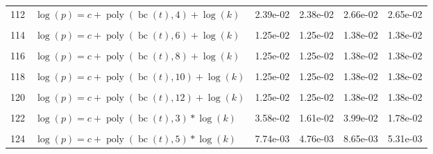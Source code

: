 \documentclass[12pt,a4paper]{article}
\DeclareMathOperator{\bc}{bc}
\DeclareMathOperator{\poly}{poly}
\begin{document}
\begin{longtable}[t]{ll>{\raggedleft\arraybackslash}p{2cm}>{\raggedleft\arraybackslash}p{2cm}>{\raggedleft\arraybackslash}p{2cm}>{\raggedleft\arraybackslash}p{2cm}}
112 & $\log(p) = c + \poly\left( \bc(t), 4 \right) + \log(k)$ & 2.39e-02 & 2.38e-02 & 2.66e-02 & 2.65e-02\\
\cellcolor{gray!6}{113} & \cellcolor{gray!6}{$\log(p) = c + \poly\left( \bc(t), 5 \right) + \log(k)$} & \cellcolor{gray!6}{1.56e-02} & \cellcolor{gray!6}{1.37e-02} & \cellcolor{gray!6}{1.73e-02} & \cellcolor{gray!6}{1.51e-02}\\
114 & $\log(p) = c + \poly\left( \bc(t), 6 \right) + \log(k)$ & 1.25e-02 & 1.25e-02 & 1.38e-02 & 1.38e-02\\
\cellcolor{gray!6}{115} & \cellcolor{gray!6}{$\log(p) = c + \poly\left( \bc(t), 7 \right) + \log(k)$} & \cellcolor{gray!6}{1.29e-02} & \cellcolor{gray!6}{1.28e-02} & \cellcolor{gray!6}{1.42e-02} & \cellcolor{gray!6}{1.41e-02}\\
116 & $\log(p) = c + \poly\left( \bc(t), 8 \right) + \log(k)$ & 1.25e-02 & 1.25e-02 & 1.38e-02 & 1.38e-02\\
\cellcolor{gray!6}{117} & \cellcolor{gray!6}{$\log(p) = c + \poly\left( \bc(t), 9 \right) + \log(k)$} & \cellcolor{gray!6}{1.25e-02} & \cellcolor{gray!6}{1.25e-02} & \cellcolor{gray!6}{1.38e-02} & \cellcolor{gray!6}{1.38e-02}\\
118 & $\log(p) = c + \poly\left( \bc(t), 10 \right) + \log(k)$ & 1.25e-02 & 1.25e-02 & 1.38e-02 & 1.38e-02\\
\cellcolor{gray!6}{119} & \cellcolor{gray!6}{$\log(p) = c + \poly\left( \bc(t), 11 \right) + \log(k)$} & \cellcolor{gray!6}{1.25e-02} & \cellcolor{gray!6}{1.25e-02} & \cellcolor{gray!6}{1.38e-02} & \cellcolor{gray!6}{1.38e-02}\\
120 & $\log(p) = c + \poly\left( \bc(t), 12 \right) + \log(k)$ & 1.25e-02 & 1.25e-02 & 1.38e-02 & 1.38e-02\\
\cellcolor{gray!6}{121} & \cellcolor{gray!6}{$\log(p) = c + \poly\left( \bc(t), 13 \right) + \log(k)$} & \cellcolor{gray!6}{1.25e-02} & \cellcolor{gray!6}{1.25e-02} & \cellcolor{gray!6}{1.38e-02} & \cellcolor{gray!6}{1.38e-02}\\
122 & $\log(p) = c + \poly\left( \bc(t), 3 \right) * \log(k)$ & 3.58e-02 & 1.61e-02 & 3.99e-02 & 1.78e-02\\
\cellcolor{gray!6}{123} & \cellcolor{gray!6}{$\log(p) = c + \poly\left( \bc(t), 4 \right) * \log(k)$} & \cellcolor{gray!6}{1.86e-02} & \cellcolor{gray!6}{1.86e-02} & \cellcolor{gray!6}{2.08e-02} & \cellcolor{gray!6}{2.07e-02}\\
124 & $\log(p) = c + \poly\left( \bc(t), 5 \right) * \log(k)$ & 7.74e-03 & 4.76e-03 & 8.65e-03 & 5.31e-03\\

\end{longtable}
\end{document}
